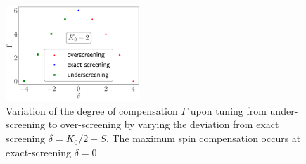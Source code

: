 \documentclass{iopart}
\begin{document}
\begin{figure}[htpb]
	\centering
	\includegraphics[width=0.45\textwidth]{degofcomp.pdf}
	\caption{Variation of the degree of compensation $\Gamma$ upon tuning from under-screening to over-screening by varying the deviation from exact screening $\delta=K_{0}/2-S$. The maximum spin compensation occurs at exact-screening \(\delta=0\).}
	\label{compen}
\end{figure}
\end{document}
